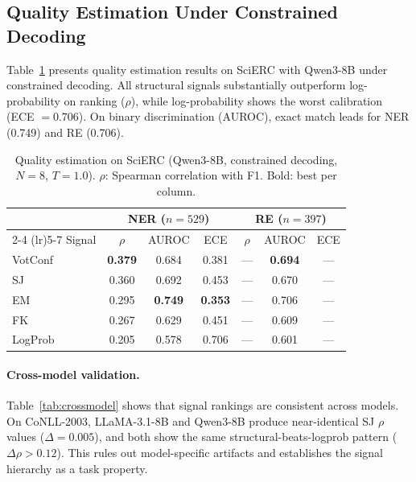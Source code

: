 \documentclass[11pt,a4paper]{article}
\newcommand{\bmark}[1]{\textbf{#1}}
\begin{document}
\subsection{Quality Estimation Under Constrained Decoding}
\label{sec:qe}

Table~\ref{tab:qe_scierc} presents quality estimation results on SciERC with Qwen3-8B under constrained decoding. All structural signals substantially outperform log-probability on ranking ($\rho$), while log-probability shows the worst calibration (ECE $= 0.706$). On binary discrimination (AUROC), exact match leads for NER (0.749) and RE (0.706).

\begin{table}[t]
\centering
\caption{Quality estimation on SciERC (Qwen3-8B, constrained decoding, $N\!=\!8$, $T\!=\!1.0$). $\rho$: Spearman correlation with F1. Bold: best per column.}
\label{tab:qe_scierc}
\small
\begin{tabular}{l ccc ccc}
\toprule
& \multicolumn{3}{c}{\textbf{NER} ($n = 529$)} & \multicolumn{3}{c}{\textbf{RE} ($n = 397$)} \\
\cmidrule(lr){2-4} \cmidrule(lr){5-7}
Signal & $\rho$ & AUROC & ECE & $\rho$ & AUROC & ECE \\
\midrule
VotConf & \bmark{0.379} & 0.684 & 0.381 & --- & \bmark{0.694} & --- \\
SJ      & 0.360 & 0.692 & 0.453 & --- & 0.670 & --- \\
EM      & 0.295 & \bmark{0.749} & \bmark{0.353} & --- & 0.706 & --- \\
FK      & 0.267 & 0.629 & 0.451 & --- & 0.609 & --- \\
LogProb & 0.205 & 0.578 & 0.706 & --- & 0.601 & --- \\
\bottomrule
\end{tabular}
\end{table}

\paragraph{Cross-model validation.}
Table~\ref{tab:crossmodel} shows that signal rankings are consistent across models. On CoNLL-2003, LLaMA-3.1-8B and Qwen3-8B produce near-identical SJ $\rho$ values ($\Delta = 0.005$), and both show the same structural-beats-logprob pattern ($\Delta\rho > 0.12$). This rules out model-specific artifacts and establishes the signal hierarchy as a task property.
\end{document}
